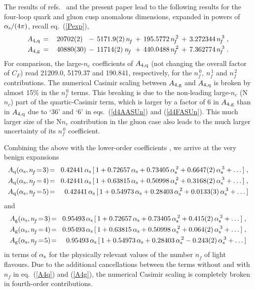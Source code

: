 \documentclass[12pt]{article}
\newcommand{\bea}{\begin{eqnarray}}
\newcommand{\eea}{\end{eqnarray}}
\newcommand{\nn}{\nonumber}
\newcommand{\als}{\alpha_{\rm s}}
\def\as(#1){{\alpha_{\rm s}^{\,#1}}}
\def\cf{{C^{}_F}}
\def\nf{{n^{}_{\! f}}}
\def\nfz{{n^{\,0}_{\! f}}}
\def\nfo{{n^{\,1}_{\! f}}}
\def\nfs{{n^{\,2}_{\! f}}}
\def\nft{{n^{\,3}_{\! f}}}
\begin{document}
The results of refs.~\cite{DRUVV,MRUVV1} and the present paper lead to the
following results for the four-loop quark and gluon cusp anomalous dimensions,
expanded in powers of $\als/(4\pi)$, recall eq.~(\ref{Pexp}),
%
\bea
\label{A4q}
  A_{4,\rm q} &\,=\,&   20702(2)\phantom{0} \,-\, 5171.9(2) \,\nf
                  \,+\, 195.5772\,\nfs      \,+\, 3.272344 \,\nft
\; , \\[-0.5mm]
\label{A4g}
  A_{4,\rm g} &\,=\,&   40880(30)      \,-\, 11714(2) \;\nf\,
                  \,+\, 440.0488\,\nfs \,+\, 7.362774 \,\nft
\; .
\eea
For comparison, the large-$n_c$ coefficients of $A_{4,\rm q}$ (not changing
the overall factor of $\cf$) read 21209.0, 5179.37 and 190.841, respectively,
for the $\nfz$, $\nfo$ and $\nfs$ contributions. The numerical Casimir scaling
between $A_{4,\rm g}$ and $A_{4,\rm q}$ is broken by almost 15\% in the $\nfz$
terms.
This breaking is due to the non-leading large-$n_c$ (N$n_c$) part of the 
quartic-Casimir term, which is larger by a factor of 6 in $A_{4,\rm g}$ 
than in $A_{4,\rm q}$ due to `36' and `6' in eqs.~(\ref{d4AASUn}) and 
(\ref{d4FASUn}). 
This much larger size of the N$n_c$ contribution in the gluon case also leads
to the much larger uncertainty of its $\nfz$ coefficient.

Combining the above with the lower-order coefficients 
, we arrive at the very benign expansions
%
\bea
\label{Aqnf345}
  A_{\rm q}(\als,\nf\!=\!3) &\!=\!& 0.42441\,\als \,
  [\, 1 +  0.72657\, \als +  0.73405\, \as(2) + 0.6647(2)\, \as(3) + \ldots\, ]
\; , \nn \\[-0.2mm]
  A_{\rm q}(\als,\nf\!=\!4) &\!=\!& 0.42441\,\als \,
  [\, 1 +  0.63815\, \als +  0.50998\, \as(2) + 0.3168(2)\, \as(3) + \ldots\, ]
\; , \nn \\[-0.2mm]
  A_{\rm q}(\als,\nf\!=\!5) &\!=\!& 0.42441\,\als \,
  [\, 1 +  0.54973\, \als +  0.28403\, \as(2) + 0.0133(3)\, \as(3) + \ldots\, ]
\eea
%
and
\bea
%
\label{Agnf345}
  A_{\rm g}(\als,\nf\!=\!3) &\!=\!& 0.95493\,\als \,
  [\, 1 + 0.72657\, \als  +  0.73405\, \as(2) + 0.415(2)\, \as(3) + \ldots\, ]
\; , \nn \\[-0.2mm]
  A_{\rm g}(\als,\nf\!=\!4) &\!=\!& 0.95493\,\als \,
  [\, 1 + 0.63815\, \als  +  0.50998\, \as(2) + 0.064(2)\, \as(3) + \ldots\, ]
\; , \nn \\[-0.2mm]
  A_{\rm g}(\als,\nf\!=\!5) &\!=\!& 0.95493\,\als \,
  [\, 1 + 0.54973\, \als  +  0.28403\, \as(2) - 0.243(2)\, \as(3) + \ldots\, ]
\eea
%
in terms of $\als$
for the physically relevant values of the number $\nf$ of light flavours.
Due to the additional cancellations between the terms without and with $\nf$
in eq.~(\ref{A4q}) and (\ref{A4g}), the numerical Casimir scaling is 
completely broken in fourth-order contributions.
 
\end{document}
